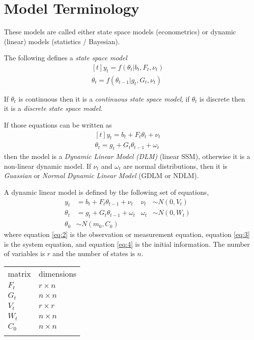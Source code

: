 \documentclass{article}\usepackage[]{graphicx}\usepackage[]{color}
\begin{document}
\section{Model Terminology}

These models are called either state space models (econometrics) or
dynamic (linear) models (statistics / Bayesian).

The following defines a \emph{state space model} 
\begin{equation*}
  \begin{aligned}[t]
    y_t = f(\theta_t \vert  b_{t}, F_t, \nu_t) \\
    \theta_t = f(\theta_{t-1} \vert g_{t},  G_t, \nu_t)
  \end{aligned}
\end{equation*}

If $\theta_t$ is continuous then it is a \emph{continuous state space
model}, if $\theta_t$ is discrete then it is a \emph{discrete state
space model}.

If those equations can be written as 
\begin{equation*}
\begin{aligned}[t]
y_t = b_{t} + F_t \theta_t + \nu_t \\
\theta_t = g_{t} + G_t \theta_{t-1} + \omega_t
\end{aligned}
\end{equation*}
then the model is a \emph{Dynamic Linear Model (DLM)} (linear SSM), otherwise it is a non-linear dynamic model.
If $\nu_t$ and $\omega_t$ are normal distributions, then it is \emph{Guassian} or \emph{Normal Dynamic Linear Model} (GDLM or NDLM). 

A dynamic linear model is defined by the following set of equations,
\begin{align}
  \label{eq:2}
  y_t &= b_{t} + F_t \theta_{t-1} + \nu_t & \nu_t & \sim N(0, V_t) \\
  \label{eq:3}
  \theta_t &= g_{t} + G_t \theta_{t-1} + \omega_t & \omega_t & \sim N(0, W_t) \\
  \label{eq:4}
  \theta_0 &\sim N(m_0, C_0)
\end{align}
where equation \ref{eq:2} is the observation or measurement equation,
equation \ref{eq:3} is the system equation, 
and equation \ref{eq:4} is the initial information.
The number of variables is $r$ and the number of states is $n$.

\begin{table}
  \centering
  \begin{tabular}[c]{@{}ll@{}}
    \hline\noalign{\medskip}
    matrix & dimensions
    \\\noalign{\medskip}
    \hline\noalign{\medskip}
    $F_t$ & $r \times n$
    \\\noalign{\medskip}
    $G_t$ & $n \times n$
    \\\noalign{\medskip}
    $V_t$ & $r \times r$
    \\\noalign{\medskip}
    $W_t$ & $n \times n$
    \\\noalign{\medskip}
    $C_0$ & $n \times n$
    \\\noalign{\medskip}
    \hline
  \end{tabular}
\end{table}
\end{document}
